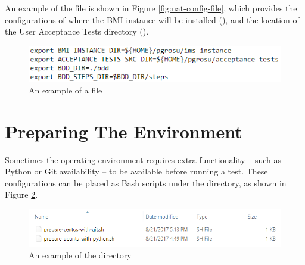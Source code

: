 An example of the  file is shown in Figure \ref{fig:uat-config-file}, which provides the configurations of where the BMI instance will be installed (), and the location of the User Acceptance Tests directory ().


\begin{figure}[!h] %
\vspace{10mm}
\begin{center}
\includegraphics[scale=1]{figures/uat-bmi-config.png}
\end{center}
\caption{An example of a  file}
\label{fig:uat-bmi-config}
\end{figure}



\section{Preparing The Environment \\} 

Sometimes the operating environment requires extra functionality -- such as Python or Git availability -- to be available before running a test.  These configurations can be placed as Bash scripts under the  directory, as shown in Figure \ref{fig:uat-prepare-environment}.

\pagebreak

\begin{figure}[!h] %
\vspace{10mm}
\begin{center}
\includegraphics[scale=0.9]{figures/uat-prepare-environment.png}
\end{center}
\caption{An example of the  directory}
\label{fig:uat-prepare-environment}
\end{figure}


